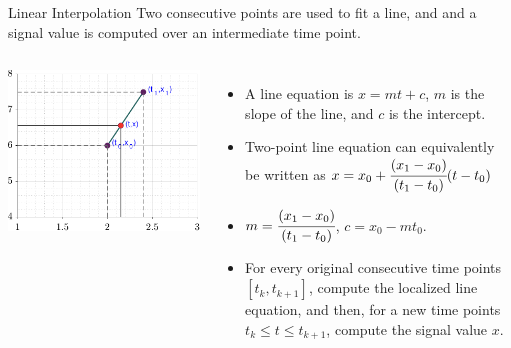\documentclass[aspectratio=169,xcolor=dvipsnames,svgnames,x11names,fleqn]{beamer}
\begin{document}
\begin{frame}{Linear Interpolation}
Two consecutive points are used to fit a line, and and a signal value is computed over an intermediate time point.

\begin{columns}
\begin{center}
\includegraphics[width=0.75\linewidth]{../Code/figures/Ch02_line_equation.pdf}

\end{center}



\footnotesize
\begin{itemize}
\item A line equation is $x = mt + c$, $m$ is the slope of the line, and $c$ is the intercept.

\item Two-point line equation can equivalently be written as $ x = x_0+ \cfrac{(x_1 - x_0)}{(t_1 - t_0)} (t - t_0)$  

\item $m = \cfrac{(x_1 - x_0)}{(t_1 - t_0)}$, $c = x_0 - m t_0$.

\item For every original consecutive time points $[t_k, t_{k+1}]$, compute the localized line equation, and then, for a new time points   $t_{k}\leq t\leq t_{k+1}$, compute the signal value $x$.
\end{itemize}
\end{columns}
\end{frame}
\end{document}
